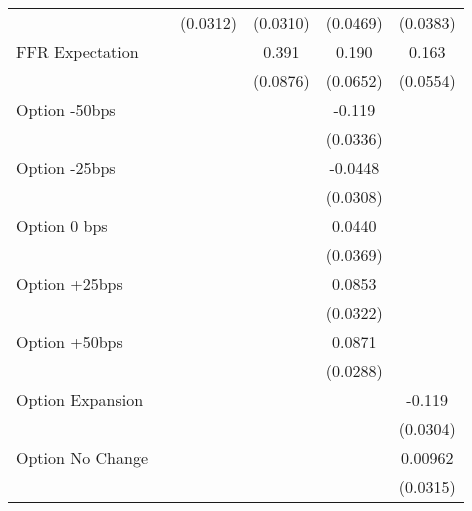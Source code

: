 {\begin{tabular}{l*{5}{c}}
                &                  & (0.0312)         & (0.0310)         & (0.0469)         & (0.0383)         \\
FFR Expectation &                  &                  &    0.391\sym{***}&    0.190\sym{***}&    0.163\sym{***}\\
                &                  &                  & (0.0876)         & (0.0652)         & (0.0554)         \\
Option -50bps   &                  &                  &                  &   -0.119\sym{***}&                  \\
                &                  &                  &                  & (0.0336)         &                  \\
Option -25bps   &                  &                  &                  &  -0.0448         &                  \\
                &                  &                  &                  & (0.0308)         &                  \\
Option 0 bps    &                  &                  &                  &   0.0440         &                  \\
                &                  &                  &                  & (0.0369)         &                  \\
Option +25bps   &                  &                  &                  &   0.0853\sym{***}&                  \\
                &                  &                  &                  & (0.0322)         &                  \\
Option +50bps   &                  &                  &                  &   0.0871\sym{***}&                  \\
                &                  &                  &                  & (0.0288)         &                  \\
Option Expansion&                  &                  &                  &                  &   -0.119\sym{***}\\
                &                  &                  &                  &                  & (0.0304)         \\
Option No Change&                  &                  &                  &                  &  0.00962         \\
                &                  &                  &                  &                  & (0.0315)         \\

\end{tabular}}
